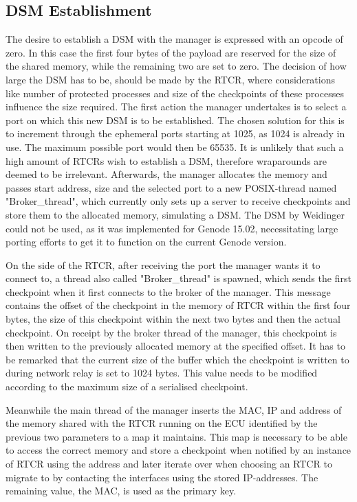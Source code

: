\subsection{DSM Establishment}\label{subsection:DSM_establishment}
The desire to establish a DSM with the manager is expressed with an opcode of zero. In this case the first four bytes of the payload are reserved for the size of the shared memory, while the remaining two are set to zero. The decision of how large the DSM has to be, should be made by the RTCR, where considerations like number of protected processes and size of the checkpoints of these processes influence the size required. The first action the manager undertakes is to select a port on which this new DSM is to be established. The chosen solution for this is to increment through the ephemeral ports starting at 1025, as 1024 is already in use. The maximum possible port would then be 65535. It is unlikely that such a high amount of RTCRs wish to establish a DSM, therefore wraparounds are deemed to be irrelevant. Afterwards, the manager allocates the memory and passes start address, size and the selected port to a new POSIX-thread named "Broker\_thread", which currently only sets up a server to receive checkpoints and store them to the allocated memory, simulating a DSM. The DSM by Weidinger could not be used, as it was implemented for Genode 15.02, necessitating large porting efforts to get it to function on the current Genode version. 

On the side of the RTCR, after receiving the port the manager wants it to connect to, a thread also called "Broker\_thread" is spawned, which sends the first checkpoint when it first connects to the broker of the manager. This message contains the offset of the checkpoint in the memory of RTCR within the first four bytes, the size of this checkpoint within the next two bytes and then the actual checkpoint. On receipt by the broker thread of the manager, this checkpoint is then written to the previously allocated memory at the specified offset. It has to be remarked that the current size of the buffer which the checkpoint is written to during network relay is set to 1024 bytes. This value needs to be modified according to the maximum size of a serialised checkpoint.

Meanwhile the main thread of the manager inserts the MAC, IP and address of the memory shared with the RTCR running on the ECU identified by the previous two parameters to a map it maintains. This map is necessary to be able to access the correct memory and store a checkpoint when notified by an instance of RTCR using the address and later iterate over when choosing an RTCR to migrate to by contacting the interfaces using the stored IP-addresses. The remaining value, the MAC, is used as the primary key.

